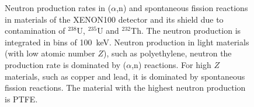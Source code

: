 \begin{figure}[!b]
{\label{figAlphaNproduction1Bq_4}}
\caption[Neutron production rates in ($\alpha$,n) and spontaneous fission reactions in materials of the XENON100 detector and its shield due to contamination of $^{238}$U, $^{235}$U and $^{232}$Th]{Neutron production rates in ($\alpha$,n) and spontaneous fission reactions in materials of the XENON100 detector and its shield due to contamination of $^{238}$U, $^{235}$U and $^{232}$Th. The neutron production is integrated in bins of 100~keV. Neutron production in light materials (with low atomic number $Z$), such as polyethylene, neutron the production rate is dominated by ($\alpha$,n) reactions. For high $Z$ materials, such as copper and lead, it is dominated by spontaneous fission reactions. The material with the highest neutron production is PTFE.}
\label{figAlphaNproduction1Bq}
\end{figure}

